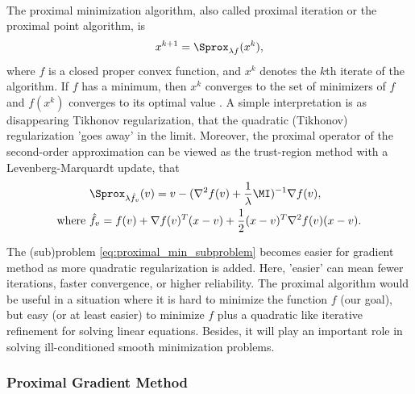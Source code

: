 \documentclass[
10pt, %
a4paper, %
oneside, %
headinclude,footinclude, %
BCOR5mm, %
]{scrartcl}
\begin{document}
\paragraph{}
The proximal minimization algorithm, also called proximal iteration or the 
proximal point algorithm, is 
\begin{equation} \label{eq:proximal_min_subproblem}
	x^{k+1} = \Sprox_{\lambda f} (x^k),
\end{equation}
where $ f $ is a closed proper convex function, and $x^k$ denotes the $k$th 
iterate of the algorithm. If $f$ has a minimum, then $x^k$ converges to the set 
of minimizers of $f$ and $f(x^k)$ converges to its optimal value 
\cite{bauschke2011convex}. A simple interpretation is as disappearing Tikhonov 
regularization, that the quadratic (Tikhonov) regularization 'goes away' 
in the limit. Moreover, the proximal operator of the second-order 
approximation can be viewed as the trust-region method with a 
Levenberg-Marquardt update, that
\begin{align} \label{eq:quadratic_proximal_minimizing}
	& \Sprox_{\lambda \hat{f}_v} (v) = 
	v - (\nabla^2 f(v) + \frac{1}{\lambda}\MI)^{-1}\nabla f(v), \\
\text{where~} & \hat{f}_v = f(v) + \nabla f(v)^T (x - v) +
	\frac{1}{2} (x-v)^T \nabla^2 f(v) (x - v). \nonumber
\end{align}

The (sub)problem \eqref{eq:proximal_min_subproblem} 
becomes easier for gradient method as more quadratic regularization is added. 
Here, 'easier' can mean fewer iterations, faster convergence, or higher 
reliability. The proximal algorithm would be useful in a situation where it is 
hard to minimize the function $f$ (our goal), but easy (or at least easier) to 
minimize $f$ plus a quadratic like iterative refinement for solving linear 
equations. Besides, it will play an important role in solving ill-conditioned 
smooth minimization problems.

\subsubsection{Proximal Gradient Method}
\end{document}
